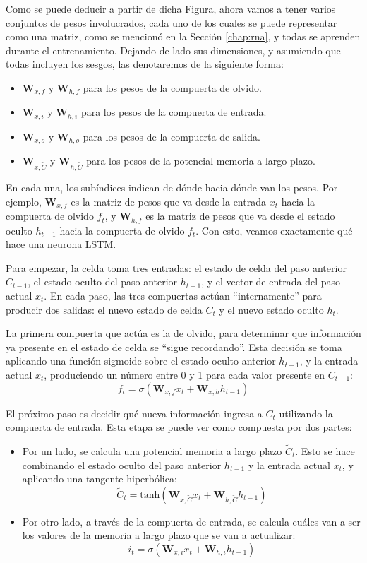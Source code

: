 \documentclass[../../main.tex]{subfiles}
\begin{document}
Como se puede deducir a partir de dicha Figura, ahora vamos a tener varios conjuntos de
pesos involucrados, cada uno de los cuales se puede representar como una matriz, como se
mencionó en la Sección \ref{chap:rna}, y todas se aprenden durante el entrenamiento.
Dejando de lado sus dimensiones, y asumiendo que todas incluyen los sesgos, las
denotaremos de la siguiente forma:
\begin{itemize}
    \item \(\bm{W}_{x,f}\) y \(\bm{W}_{h,f}\) para los pesos de la compuerta de olvido.
    \item \(\bm{W}_{x,i}\) y \(\bm{W}_{h,i}\) para los pesos de la compuerta de entrada.
    \item \(\bm{W}_{x,o}\) y \(\bm{W}_{h,o}\) para los pesos de la compuerta de salida.
    \item \(\bm{W}_{x, \tilde{C}}\) y \(\bm{W}_{h, \tilde{C}}\) para los pesos de la potencial
    memoria a largo plazo.
\end{itemize}
En cada una, los subíndices indican de dónde hacia dónde van los pesos. Por ejemplo,
\(\bm{W}_{x,f}\) es la matriz de pesos que va desde la entrada \(x_t\) hacia la compuerta
de olvido \(f_t\), y \(\bm{W}_{h,f}\) es la matriz de pesos que va desde el estado oculto
\(h_{t-1}\) hacia la compuerta de olvido \(f_t\). Con esto, veamos exactamente qué
hace una neurona LSTM.

Para empezar, la celda toma tres entradas: el estado de celda del paso anterior
\(C_{t-1}\), el estado oculto del paso anterior \(h_{t-1}\), y el vector de entrada del
paso actual \(x_t\). En cada paso, las tres compuertas actúan ``internamente'' para
producir dos salidas: el nuevo estado de celda \(C_t\) y el nuevo estado oculto \(h_t\).

La primera compuerta que actúa es la de olvido, para determinar que información ya
presente en el estado de celda se ``sigue recordando''. Esta decisión se toma aplicando
una función sigmoide sobre el estado oculto anterior \(h_{t-1}\), y la entrada actual
\(x_t\), produciendo un número entre 0 y 1 para cada valor presente en \(C_{t-1}\):
\[
    f_t = \sigma \left( \bm{W}_{x,f} x_t + \bm{W}_{x,h} h_{t-1}  \right)
\]

El próximo paso es decidir qué nueva información ingresa a \(C_t\) utilizando la compuerta
de entrada. Esta etapa se puede ver como compuesta por dos partes:
\begin{itemize}
    \item Por un lado, se calcula una potencial memoria a largo plazo \(\tilde{C}_t\).
    Esto se hace combinando el estado oculto del paso anterior \(h_{t-1}\) y la entrada
    actual \(x_t\), y aplicando una tangente hiperbólica:
    \[
        \tilde{C}_t = \text{tanh} \left( \bm{W}_{x, \tilde{C}} x_t + \bm{W}_{h, \tilde{C}} h_{t-1}  \right)
    \]
    \item Por otro lado, a través de la compuerta de entrada, se calcula cuáles
    van a ser los valores de la memoria a largo plazo que se van a actualizar:
    \[
        i_t = \sigma \left( \bm{W}_{x, i} x_t + \bm{W}_{h, i} h_{t-1}  \right)
    \]
\end{itemize}
\end{document}
